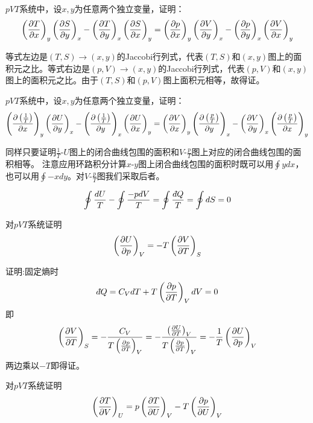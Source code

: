 \documentclass[CJK]{beamer}
\begin{document}
\begin{frame}
  \chtitle{\proid  (\sthree)}
  \bch
  $pVT$系统中，设$x, y$为任意两个独立变量，证明：
      {\small $$ \pfrac Txy \pfrac Syx - \pfrac Tyx \pfrac Sxy = \pfrac pxy \pfrac Vyx - \pfrac pyx \pfrac Vxy $$}  
  \ech
\end{frame}


\begin{frame}
  \bch
等式左边是$(T,S)\rightarrow (x, y)$的Jaccobi行列式，代表$(T,S)$和$(x,y)$图上的面积元之比。等式右边是$(p,V)\rightarrow (x, y)$的Jaccobi行列式，代表$(p,V)$和$(x,y)$图上的面积元之比。由于$(T,S)$和$(p,V)$图上面积元相等，故得证。
  \ech
\end{frame}

\begin{frame}
  \bch
  $pVT$系统中，设$x, y$为任意两个独立变量，证明：
      {\scriptsize $$ \pfrac {\left(\frac{1}{T}\right)}xy \pfrac Uyx - \pfrac {\left(\frac{1}{T}\right)}yx \pfrac Uxy = \pfrac Vxy \pfrac {\left(\frac{p}{T}\right)}yx - \pfrac Vyx \pfrac {\left(\frac{p}{T}\right)}xy $$}  
  \ech
\end{frame}

\begin{frame}
  \bch
  同样只要证明$\frac{1}{T}$-$U$图上的闭合曲线包围的面积和$V$-$\frac{p}{T}$图上对应的闭合曲线包围的面积相等。
  注意应用环路积分计算$x$-$y$图上闭合曲线包围的面积时既可以用$\oint ydx$，也可以用$\oint -x dy$。对$V$-$\frac{p}{T}$图我们采取后者。
  
  $$\oint \frac{dU}{T} - \oint \frac{-pdV}{T} = \oint \frac{\dbar Q}{T} = \oint dS = 0$$
  
  \ech
\end{frame}

\begin{frame}
  \bch
  对$pVT$系统证明
  $$\pfrac UpV = -T\pfrac VTS$$
  \ech
\end{frame}


\begin{frame}
  \bch
  证明:固定熵时
  $$ \dbar Q = C_V dT + T \pfrac pTV dV = 0 $$
  即
  $$ \pfrac VTS = -\frac{C_V}{T\pfrac pTV} = -\frac{\pfrac UTV}{T\pfrac pTV} = -\frac{1}{T} \pfrac UpV $$
  两边乘以$-T$即得证。
  \ech
\end{frame}

\begin{frame}
  \bch
  对$pVT$系统证明
  $$\pfrac TVU = p\pfrac TUV - T\pfrac pUV $$
  \ech
\end{frame}
\end{document}
